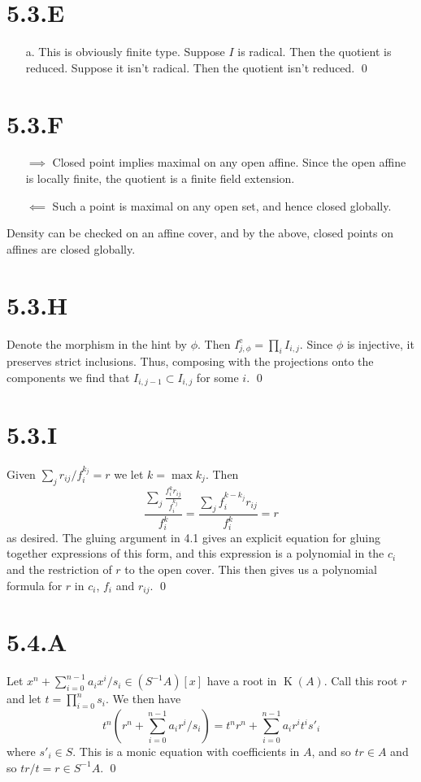\documentclass{article}
\begin{document}
\section{5.3.E}
\begin{itemize}
    \item [a.] This is obviously finite type. Suppose $I$ is radical. Then the quotient is reduced. Suppose it isn't radical. Then the quotient isn't reduced. \qed
\end{itemize}

\section{5.3.F}
\begin{itemize}
    \item [$\implies$] Closed point implies maximal on any open affine. Since the open affine is locally finite, the quotient is a finite field extension.
    \item [$\impliedby$] Such a point is maximal on any open set, and hence closed globally.
\end{itemize}
Density can be checked on an affine cover, and by the above, closed points on affines are closed globally.

\section{5.3.H}
Denote the morphism in the hint by $\phi$. Then $I_{j,\phi}^{\text{e}}=\prod_i I_{i,j}$. Since $\phi$ is injective, it preserves strict inclusions. Thus, composing with the projections onto the components we find that $I_{i,j-1} \subset I_{i,j}$ for some $i$. \qed

\section{5.3.I}
Given $\sum_j r_{ij}/f_i^{k_j}=r$ we let $k=\max k_j$. Then
\[
    \frac{\sum_j \frac{f_i^kr_{ij}}{f_i^{k_j}}}{f_i^k}=\frac{\sum_j f_i^{k-k_j}r_{ij}}{f_i^k}=r
\]
as desired. The gluing argument in 4.1 gives an explicit equation for gluing together expressions of this form, and this expression is a polynomial in the $c_i$ and the restriction of $r$ to the open cover. This then gives us a polynomial formula for $r$ in $c_i$, $f_i$ and $r_{ij}$. \qed

\section{5.4.A}
Let $x^n+\sum_{i=0}^{n-1} a_ix^i/s_i \in (S^{-1}A)[x]$ have a root in $\operatorname{K}(A)$. Call this root $r$ and let $t=\prod_{i=0}^n s_i$. We then have
\[
    t^n(r^n+\sum_{i=0}^{n-1} a_ir^i/s_i)=t^nr^n+\sum_{i=0}^{n-1} a_ir^it^is'_i
\]
where $s'_i \in S$. This is a monic equation with coefficients in $A$, and so $tr \in A$ and so $tr/t=r \in S^{-1}A$. \qed
\end{document}
